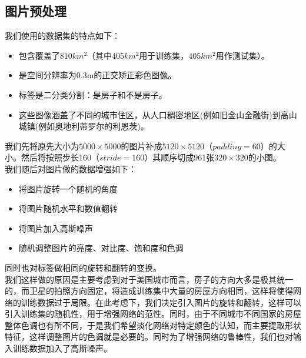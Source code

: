 \documentclass[a4paper,12pt]{article}
\begin{document}
\begin{CJK*}{UTF8}{gbsn}
\begin{spacing}{1.2}
    \section{图片预处理}
    我们使用的数据集的特点如下：
    \begin{itemize}
        \item 包含覆盖了$810km^2$（其中$405km^2$用于训练集，$405km^2$用作测试集）。
        \item 是空间分辨率为0.3m的正交矫正彩色图像。
        \item 标签是二分类分割：是房子和不是房子。
        \item 这些图像涵盖了不同的城市住区，从人口稠密地区(例如旧金山金融街)到高山城镇(例如奥地利蒂罗尔的利恩茨)。
    \end{itemize}
    我们先将原先大小为$5000\times5000$的图片补成$5120\times5120$（$padding=60$）的大小。然后将按照步长160（$stride=160$）其顺序切成961张$320\times320$的小图。\\
    我们随后对图片做的数据增强如下：
    \begin{itemize}
        \item 将图片旋转一个随机的角度
        \item 将图片随机水平和数值翻转
        \item 将图片加入高斯噪声
        \item 随机调整图片的亮度、对比度、饱和度和色调
    \end{itemize}
    同时也对标签做相同的旋转和翻转的变换。\\
    我们这样做的原因是主要考虑到对于美国城市而言，房子的方向大多是极其统一的，而卫星的拍照方向固定，将造成训练集中大量的房屋方向相同，这样将使得网络的训练数据过于局限。在此考虑下，我们决定引入图片的旋转和翻转，这样可以引入训练集的随机性，用于增强网络的范性。同时，由于不同城市不同国家的房屋整体色调也有所不同，于是我们希望淡化网络对特定颜色的认知，而主要提取形状特征，这样调整图片的色调就是必要的。同时为了增强网络的鲁棒性，我们也对输入训练数据加入了高斯噪声。





\end{spacing}
\end{CJK*}
\end{document}
